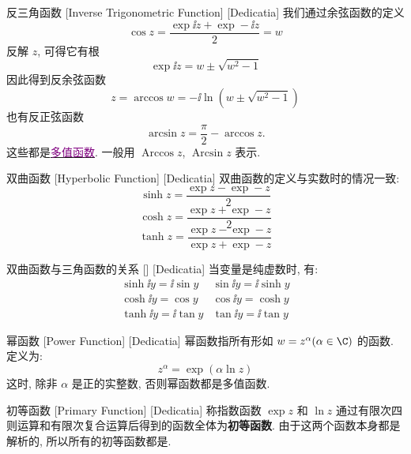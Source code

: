 \documentclass[UTF8]{ctexart}
\newcommand{\hyperrefc}[2]{\hyperref[#1]{\textcolor{purple}{#2}}}
\begin{document}
        \begin{dfn}
            [InverseTriangular]
            {反三角函数}
            [Inverse Trigonometric Function]
            [Dedicatia]
            我们通过余弦函数的定义
            \[\cos z=\frac{\exp\ii z+\exp -\ii z}{2}=w\]
            反解 \(z\), 可得它有根
            \[\exp\ii z=w\pm\sqrt{w^2-1}\]
            因此得到反余弦函数
            \[z=\arccos w=-\ii\ln(w\pm\sqrt{w^2-1})\]
            也有反正弦函数
            \[\arcsin z=\frac{\pi}{2}-\arccos z.\]
            这些都是\hyperrefc{dfn:Multivalued}{多值函数}. 一般用 \(\operatorname{Arccos}z\),  \(\operatorname{Arcsin}z\) 表示. \\
        \end{dfn}

        \begin{dfn}
            [HyperbolicFunction]
            {双曲函数}
            [Hyperbolic Function]
            [Dedicatia]
            双曲函数的定义与实数时的情况一致: 
            \[\sinh z=\frac{\exp z-\exp -z}{2}\]
            \[\cosh z=\frac{\exp z+\exp -z}{2}\]
            \[\tanh z=\frac{\exp z-\exp -z}{\exp z+\exp -z}\]
        \end{dfn}

        \begin{ppt}
            [UUID]
            {双曲函数与三角函数的关系}
            []
            [Dedicatia]
            当变量是纯虚数时, 有: 
            \[\begin{array}{cc}
                \sinh\ii y=\ii\sin y&\sin\ii y=\ii\sinh y\\
                \cosh\ii y=\cos y&\cos\ii y=\cosh y\\
                \tanh\ii y=\ii\tan y&\tan\ii y=\ii\tan y
            \end{array}\]
        \end{ppt}

        \begin{dfn}
            [UUID]
            {幂函数}
            [Power Function]
            [Dedicatia]
            幂函数指所有形如 \(w=z^\alpha (\alpha\in\C)\) 的函数. 定义为: 
            \[z^\alpha = \exp(\alpha \ln z)\]
            这时, 除非 \(\alpha\) 是正的实整数, 否则幂函数都是多值函数. 
        \end{dfn}

        \begin{dfn}
            [UUID]
            {初等函数}
            [Primary Function]
            [Dedicatia]
            称指数函数 \(\exp z\) 和 \(\ln z\) 通过有限次四则运算和有限次复合运算后得到的函数全体为\textbf{初等函数}. 由于这两个函数本身都是解析的, 所以所有的初等函数都是. 
        \end{dfn}
\end{document}
